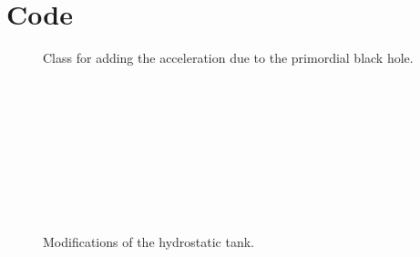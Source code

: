 \documentclass[10pt]{article}
\begin{document}
\lstset{style=mystyle}

\section{Code}

\begin{figure}[htbp]

\caption{Class for adding the acceleration due to the primordial black hole.}
\label{fig:blackholeclass}
\end{figure}

\begin{figure}[htbp]
 \begin{subfigure}{\textwidth}
  
 \end{subfigure} \\
 \begin{subfigure}{\textwidth}
  
 \end{subfigure} \\ 
 \begin{subfigure}{\textwidth}
  
 \end{subfigure} \\
  \begin{subfigure}{\textwidth}
  
 \end{subfigure} \\
 \begin{subfigure}{\textwidth}
  
 \end{subfigure} \\
 \begin{subfigure}{\textwidth}
  
 \end{subfigure}
 \caption{Modifications of the hydrostatic tank.}
\end{figure}
\end{document}
